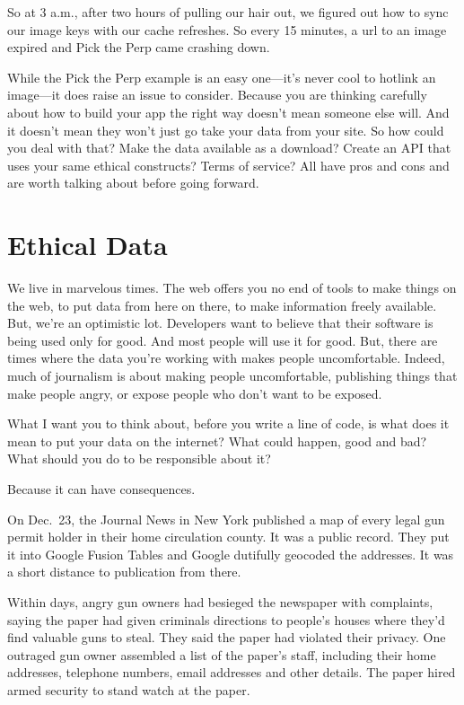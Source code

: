 \documentclass[
  letterpaper,
  DIV=11,
  numbers=noendperiod]{scrreprt}
\begin{document}
So at 3 a.m., after two hours of pulling our hair out, we figured out
how to sync our image keys with our cache refreshes. So every 15
minutes, a url to an image expired and Pick the Perp came crashing down.

While the Pick the Perp example is an easy one---it's never cool to
hotlink an image---it does raise an issue to consider. Because you are
thinking carefully about how to build your app the right way doesn't
mean someone else will. And it doesn't mean they won't just go take your
data from your site. So how could you deal with that? Make the data
available as a download? Create an API that uses your same ethical
constructs? Terms of service? All have pros and cons and are worth
talking about before going forward.

\hypertarget{ethical-data}{%
\section{Ethical Data}\label{ethical-data}}

We live in marvelous times. The web offers you no end of tools to make
things on the web, to put data from here on there, to make information
freely available. But, we're an optimistic lot. Developers want to
believe that their software is being used only for good. And most people
will use it for good. But, there are times where the data you're working
with makes people uncomfortable. Indeed, much of journalism is about
making people uncomfortable, publishing things that make people angry,
or expose people who don't want to be exposed.

What I want you to think about, before you write a line of code, is what
does it mean to put your data on the internet? What could happen, good
and bad? What should you do to be responsible about it?

Because it can have consequences.

On Dec.~23, the Journal News in New York published a map of every legal
gun permit holder in their home circulation county. It was a public
record. They put it into Google Fusion Tables and Google dutifully
geocoded the addresses. It was a short distance to publication from
there.

Within days, angry gun owners had besieged the newspaper with
complaints, saying the paper had given criminals directions to people's
houses where they'd find valuable guns to steal. They said the paper had
violated their privacy. One outraged gun owner assembled a list of the
paper's staff, including their home addresses, telephone numbers, email
addresses and other details. The paper hired armed security to stand
watch at the paper.
\end{document}
